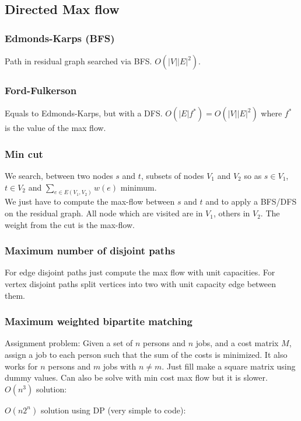 \subsection{Directed Max flow}
\subsubsection{Edmonds-Karps (BFS)}
Path in residual graph searched via BFS. $O(|V||E|^2)$.\\


\subsubsection{Ford-Fulkerson}
Equals to Edmonds-Karps, but with a DFS. $O(|E|f^*)=O(|V||E|^2)$ where $f^*$ is the value of the max flow.


\subsubsection{Min cut}
We search, between two nodes $s$ and $t$, subsets of nodes $V_1$ and $V_2$ so as $s\in V_1$, $t\in V_2$ and $\sum_{e \in E(V_1, V_2)} w(e)$ minimum.\\
We just have to compute the max-flow between $s$ and $t$ and to apply a BFS/DFS on the residual graph. All node which are visited are in $V_1$, others in $V_2$. The weight from the cut is the max-flow.
\subsubsection{Maximum number of disjoint paths}
For edge disjoint paths just compute the max flow with unit capacities. For vertex disjoint paths split vertices into two with unit capacity edge between them.
\subsubsection{Maximum weighted bipartite matching}
Assignment problem: Given a set of $n$ persons and $n$ jobs, and a cost matrix $M$, assign a job to each person such that the sum of the costs is minimized. It also works for $n$ persons and $m$ jobs with $n \neq m$. Just fill make a square matrix using dummy values. Can also be solve with min cost max flow but it is slower. \\

$O(n^3)$ solution:

\vspace{0.5cm}
$O(n 2^n)$ solution using DP (very simple to code):



